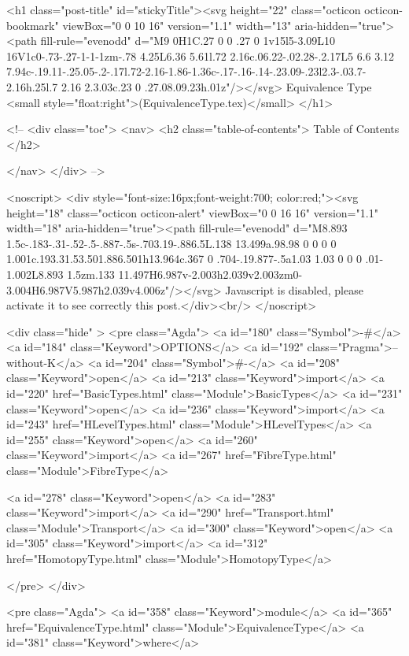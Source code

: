   <h1 class="post-title" id="stickyTitle"><svg height="22" class="octicon octicon-bookmark" viewBox="0 0 10 16" version="1.1" width="13" aria-hidden="true"><path fill-rule="evenodd" d="M9 0H1C.27 0 0 .27 0 1v15l5-3.09L10 16V1c0-.73-.27-1-1-1zm-.78 4.25L6.36 5.61l.72 2.16c.06.22-.02.28-.2.17L5 6.6 3.12 7.94c-.19.11-.25.05-.2-.17l.72-2.16-1.86-1.36c-.17-.16-.14-.23.09-.23l2.3-.03.7-2.16h.25l.7 2.16 2.3.03c.23 0 .27.08.09.23h.01z"/></svg> Equivalence Type <small style="float:right">(EquivalenceType.tex)</small>
  </h1>

  <!-- 
  <div class="toc">
    <nav>
    <h2 class="table-of-contents"> Table of Contents </h2>
      

    </nav>
  </div>
   -->

  <noscript>
  <div style="font-size:16px;font-weight:700; color:red;"><svg height="18" class="octicon octicon-alert" viewBox="0 0 16 16" version="1.1" width="18" aria-hidden="true"><path fill-rule="evenodd" d="M8.893 1.5c-.183-.31-.52-.5-.887-.5s-.703.19-.886.5L.138 13.499a.98.98 0 0 0 0 1.001c.193.31.53.501.886.501h13.964c.367 0 .704-.19.877-.5a1.03 1.03 0 0 0 .01-1.002L8.893 1.5zm.133 11.497H6.987v-2.003h2.039v2.003zm0-3.004H6.987V5.987h2.039v4.006z"/></svg> Javascript is disabled, please activate it to see correctly this post.</div><br/>
  </noscript>

  <div class="hide" >
<pre class="Agda">
<a id="180" class="Symbol">{-#</a> <a id="184" class="Keyword">OPTIONS</a> <a id="192" class="Pragma">--without-K</a> <a id="204" class="Symbol">#-}</a>
<a id="208" class="Keyword">open</a> <a id="213" class="Keyword">import</a> <a id="220" href="BasicTypes.html" class="Module">BasicTypes</a>
<a id="231" class="Keyword">open</a> <a id="236" class="Keyword">import</a> <a id="243" href="HLevelTypes.html" class="Module">HLevelTypes</a>
<a id="255" class="Keyword">open</a> <a id="260" class="Keyword">import</a> <a id="267" href="FibreType.html" class="Module">FibreType</a>

<a id="278" class="Keyword">open</a> <a id="283" class="Keyword">import</a> <a id="290" href="Transport.html" class="Module">Transport</a>
<a id="300" class="Keyword">open</a> <a id="305" class="Keyword">import</a> <a id="312" href="HomotopyType.html" class="Module">HomotopyType</a>

</pre>
</div>

<pre class="Agda">
<a id="358" class="Keyword">module</a> <a id="365" href="EquivalenceType.html" class="Module">EquivalenceType</a> <a id="381" class="Keyword">where</a>

